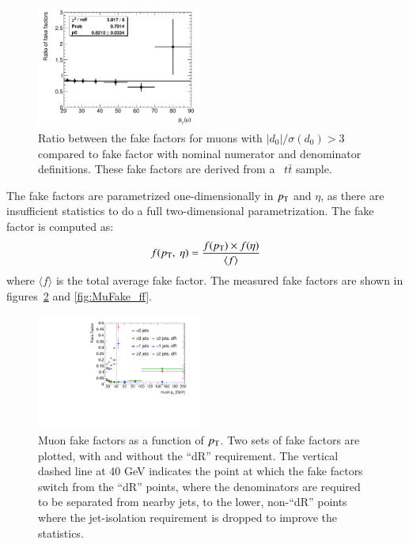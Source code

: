 \begin{figure}[h]
\centering \includegraphics[width=0.48\textwidth]{figures/backgrounds/MuFake_extrap_ratio}
\caption{\label{fig:MuFake_extrap}Ratio between the fake factors for muons with $|d_0|/\sigma(d_0)>3$ compared to fake factor with nominal numerator and denominator definitions.  These fake factors are derived from a \powheg\ $t\bar{t}$ sample.}
\end{figure}

The fake factors are parametrized one-dimensionally in $p_{\text{T}}$ and $\eta$, as there are insufficient statistics to do a full two-dimensional parametrization. The fake factor is computed as:
\begin{equation}
f(\pt,\ \eta) = \frac{f(\pt)\times f(\eta)}{\langle f \rangle}
\end{equation}
where $\langle f \rangle$ is the total average fake factor. The measured fake factors are shown in figures~\ref{fig:MuFake_ff_1D} and \ref{fig:MuFake_ff}. 

\begin{figure}
\centering \includegraphics[width=0.48\textwidth]{figures/backgrounds/all_1D_pt}
\caption{\label{fig:MuFake_ff_1D}Muon fake factors as a function of $p_{\text{T}}$. Two sets of fake factors are plotted, with and without the ``dR'' requirement. The vertical dashed line at 40 GeV indicates the point at which the fake factors switch from the ``dR'' points, where the denominators are required to be separated from nearby jets, to the lower, non-``dR'' points where the jet-isolation requirement is dropped to improve the statistics.}
\end{figure}

